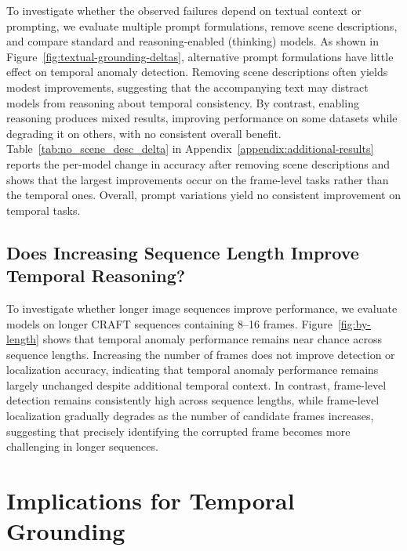 \documentclass[11pt]{article}
\begin{document}
To investigate whether the observed failures depend on textual context or prompting, we evaluate multiple prompt formulations, remove scene descriptions, and compare standard and reasoning-enabled (thinking) models. As shown in Figure~\ref{fig:textual-grounding-deltas}, alternative prompt formulations have little effect on temporal anomaly detection. Removing scene descriptions often yields modest improvements, suggesting that the accompanying text may distract models from reasoning about temporal consistency. By contrast, enabling reasoning produces mixed results, improving performance on some datasets while degrading it on others, with no consistent overall benefit. Table~\ref{tab:no_scene_desc_delta} in Appendix~\ref{appendix:additional-results} reports the per-model change in accuracy after removing scene descriptions and shows that the largest improvements occur on the frame-level tasks rather than the temporal ones. Overall, prompt variations yield no consistent improvement on temporal tasks. 

\subsection{Does Increasing Sequence Length Improve Temporal Reasoning?}
\label{sec:sec_length}
To investigate whether longer image sequences improve performance, we evaluate models on longer CRAFT sequences containing 8--16 frames. Figure~\ref{fig:by-length} shows that temporal anomaly performance remains near chance across sequence lengths. Increasing the number of frames does not improve detection or localization accuracy, indicating that temporal anomaly performance remains largely unchanged despite additional temporal context. In contrast, frame-level detection remains consistently high across sequence lengths, while frame-level localization gradually degrades as the number of candidate frames increases, suggesting that precisely identifying the corrupted frame becomes more challenging in longer sequences.


\section{Implications for Temporal Grounding}
\end{document}
